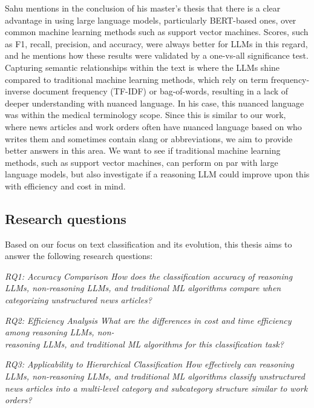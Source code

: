 Sahu \cite{sahu2025language} mentions in the conclusion of his master's thesis that there is a clear advantage in using large language models, particularly BERT-based ones, over common machine learning methods such as support vector machines. Scores, such as F1, recall, precision, and accuracy, were always better for LLMs in this regard, and he mentions how these results were validated by a one-vs-all significance test. Capturing semantic relationships within the text is where the LLMs shine compared to traditional machine learning methods, which rely on term frequency-inverse document frequency (TF-IDF) or bag-of-words, resulting in a lack of deeper understanding with nuanced language. In his case, this nuanced language was within the medical terminology scope. Since this is similar to our work, where news articles and work orders often have nuanced language based on who writes them and sometimes contain slang or abbreviations, we aim to provide better answers in this area. We want to see if traditional machine learning methods, such as support vector machines, can perform on par with large language models, but also investigate if a reasoning LLM could improve upon this with efficiency and cost in mind.



\subsection{Research questions}

Based on our focus on text classification and its evolution, this thesis aims to answer the following research questions:

\bigskip
\textit{RQ1: Accuracy Comparison
\newline
How does the classification accuracy of reasoning LLMs, non-reasoning LLMs, and traditional ML algorithms compare when categorizing unstructured news articles?}

\bigskip
\textit{RQ2: Efficiency Analysis
\newline
What are the differences in cost and time efficiency among reasoning LLMs, non-\\reasoning LLMs, and traditional ML algorithms for this classification task?}

\bigskip
\textit{RQ3: Applicability to Hierarchical Classification
\newline
How effectively can reasoning LLMs, non-reasoning LLMs, and traditional ML algorithms classify unstructured news articles into a multi-level category and subcategory structure similar to work orders?}

